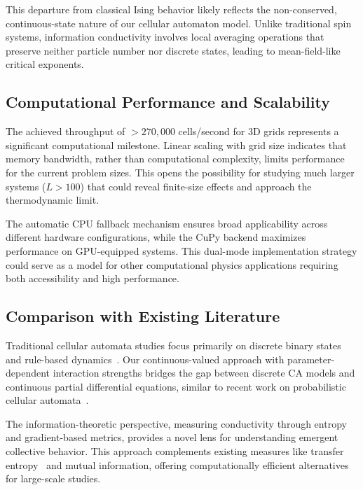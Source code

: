 This departure from classical Ising behavior likely reflects the non-conserved, 
continuous-state nature of our cellular automaton model. Unlike traditional 
spin systems, information conductivity involves local averaging operations 
that preserve neither particle number nor discrete states, leading to 
mean-field-like critical exponents.

\subsection{Computational Performance and Scalability}

The achieved throughput of $>270,000$ cells/second for 3D grids represents 
a significant computational milestone. Linear scaling with grid size indicates 
that memory bandwidth, rather than computational complexity, limits performance 
for the current problem sizes. This opens the possibility for studying much 
larger systems ($L > 100$) that could reveal finite-size effects and approach 
the thermodynamic limit.

The automatic CPU fallback mechanism ensures broad applicability across 
different hardware configurations, while the CuPy backend maximizes performance 
on GPU-equipped systems. This dual-mode implementation strategy could serve 
as a model for other computational physics applications requiring both 
accessibility and high performance.

\subsection{Comparison with Existing Literature}

Traditional cellular automata studies focus primarily on discrete binary states 
and rule-based dynamics~\cite{wolfram2002new}. Our continuous-valued approach 
with parameter-dependent interaction strengths bridges the gap between 
discrete CA models and continuous partial differential equations, similar 
to recent work on probabilistic cellular automata~\cite{sample_pca_ref}.

The information-theoretic perspective, measuring conductivity through entropy 
and gradient-based metrics, provides a novel lens for understanding emergent 
collective behavior. This approach complements existing measures like 
transfer entropy~\cite{schreiber2000measuring} and mutual information, 
offering computationally efficient alternatives for large-scale studies.

